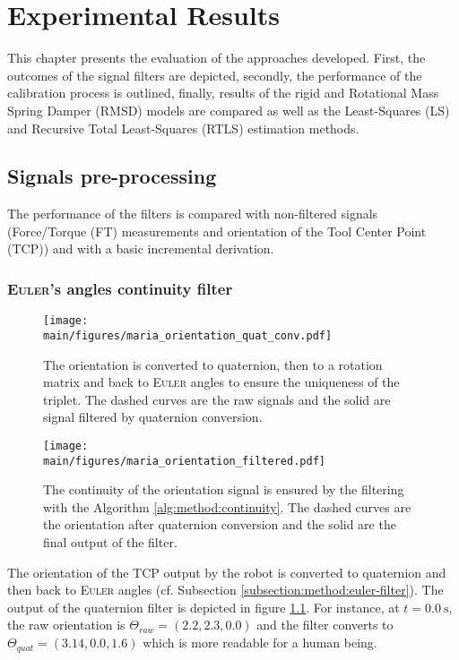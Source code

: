 \documentclass[/home/francois/latex/report/main.tex]{subfiles}
\begin{document}
\chapter{Experimental Results}
\label{chapter:results}

This chapter presents the evaluation of the approaches developed. First, the outcomes of the signal filters are depicted, secondly, the performance of the calibration process is outlined, finally, results of the rigid and Rotational Mass Spring Damper (RMSD) models are compared as well as the Least-Squares (LS) and Recursive Total Least-Squares (RTLS) estimation methods.

\section{Signals pre-processing}
\label{section:results:pre-processing}

The performance of the filters is compared with non-filtered signals (Force/Torque (FT) measurements and orientation of the Tool Center Point (TCP)) and with a basic incremental derivation.

\subsection{\textsc{Euler}'s angles continuity filter}

\begin{figure}[h!]
  \centering
  \texttt{[image: \\main/figures/maria\_orientation\_quat\_conv.pdf]}
    \caption{The orientation is converted to quaternion, then to a rotation matrix and back to \textsc{Euler} angles to ensure the uniqueness of the triplet. The dashed curves are the raw signals and the solid are signal filtered by quaternion conversion.}
  \label{fig:results:quat-conv}
\end{figure}

\begin{figure}[h!]
  \centering
  \texttt{[image: \\main/figures/maria\_orientation\_filtered.pdf]}
  \caption{The continuity of the orientation signal is ensured by the filtering with the Algorithm \ref{alg:method:continuity}. The dashed curves are the orientation after quaternion conversion and the solid are the final output of the filter.}
  \label{fig:results:orientation-filtered}
\end{figure}

The orientation of the \ac{TCP} output by the robot is converted to quaternion and then back to \textsc{Euler} angles (cf. Subsection \ref{subsection:method:euler-filter}). The output of the quaternion filter is depicted in figure \ref{fig:results:quat-conv}. For instance, at $t = 0.0 \ \si{\second}$, the raw orientation is $\Theta_{raw} = (2.2, 2.3, 0.0)$ and the filter converts to  $\Theta_{quat} = (3.14, 0.0, 1.6)$ which is more readable for a human being.
\end{document}
